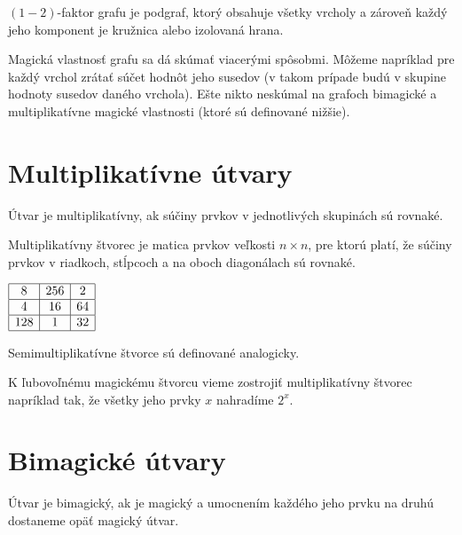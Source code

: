 \begin{note} $(1-2)$-faktor grafu je podgraf, ktorý obsahuje všetky vrcholy a zároveň každý jeho komponent je kružnica alebo izolovaná hrana. 
\end{note} 

Magická vlastnosť grafu sa dá skúmať viacerými spôsobmi. Môžeme napríklad pre každý vrchol zrátať súčet hodnôt jeho susedov (v takom prípade budú v skupine hodnoty susedov daného vrchola). Ešte nikto neskúmal na grafoch bimagické a multiplikatívne magické vlastnosti (ktoré sú definované nižšie).

\section{Multiplikatívne útvary}
\begin{definition} Útvar je multiplikatívny, ak súčiny prvkov v jednotlivých skupinách sú rovnaké.
\end{definition}

\begin{definition} Multiplikatívny štvorec je matica prvkov veľkosti $n \times n$, pre ktorú platí, že súčiny prvkov v riadkoch, stĺpcoch a na oboch diagonálach sú rovnaké.
\end{definition}

\begin{center}
$\begin{array}{ |c|c|c| } 
\hline
8 & 256 & 2 \\ 
\hline
4 & 16 & 64 \\ 
\hline
128 & 1 & 32 \\
\hline
\end{array}$
\end{center}

\begin{note} Semimultiplikatívne štvorce sú definované analogicky.
\end{note}

K ľubovoľnému magickému štvorcu vieme zostrojiť multiplikatívny štvorec napríklad tak, že všetky jeho prvky $x$ nahradíme $2^x$.

\section{Bimagické útvary}
\begin{definition} Útvar je bimagický, ak je magický a umocnením každého jeho prvku na druhú dostaneme opäť magický útvar.
\end{definition}

